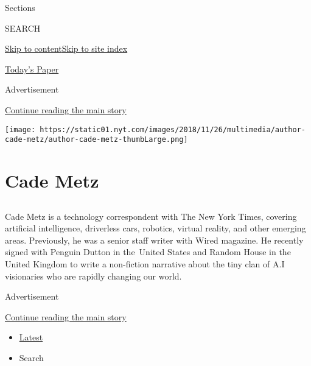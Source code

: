 Sections

SEARCH

\protect\hyperlink{site-content}{Skip to
content}\protect\hyperlink{site-index}{Skip to site index}

\href{https://myaccount.nytimes.com/auth/login?response_type=cookie\&client_id=vi}{}

\href{https://www.nytimes.com/section/todayspaper}{Today's Paper}

Advertisement

\protect\hyperlink{after-top}{Continue reading the main story}

\texttt{[image: https://static01.nyt.com/images/2018/11/26/multimedia/author-cade-metz/author-cade-metz-thumbLarge.png]}

\hypertarget{cade-metz}{%
\section{Cade Metz}\label{cade-metz}}

\hypertarget{section}{%
\subsection{}\label{section}}

Cade Metz is a technology correspondent with The New York Times,
covering artificial intelligence, driverless cars, robotics, virtual
reality, and other emerging areas. Previously, he was a senior staff
writer with Wired magazine. He recently signed with Penguin Dutton in
the~United States and Random House in the United Kingdom to write a
non-fiction narrative about the tiny clan of A.I visionaries who are
rapidly changing our world.

Advertisement

\protect\hyperlink{after-mid1}{Continue reading the main story}

\begin{itemize}
\tightlist
\item
  \protect\hyperlink{stream-panel}{Latest}
\item
  Search
\end{itemize}

